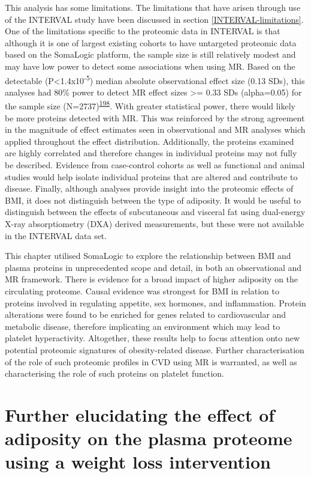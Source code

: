 \documentclass[11pt,twoside]{bristolthesis}
\begin{document}
This analysis has some limitations. The limitations that have arisen through use of the INTERVAL study have been discussed in section \ref{INTERVAL-limitations}. One of the limitations specific to the proteomic data in INTERVAL is that although it is one of largest existing cohorts to have untargeted proteomic data based on the SomaLogic platform, the sample size is still relatively modest and may have low power to detect some associations when using MR. Based on the detectable (P\textless1.4x10\textsuperscript{-5}) median absolute observational effect size (0.13 SDs), this analyses had 80\% power to detect MR effect sizes \textgreater= 0.33 SDs (alpha=0.05) for the sample size (N=2737)\textsuperscript{\protect\hyperlink{ref-Brion2013}{198}}. With greater statistical power, there would likely be more proteins detected with MR. This was reinforced by the strong agreement in the magnitude of effect estimates seen in observational and MR analyses which applied throughout the effect distribution. Additionally, the proteins examined are highly correlated and therefore changes in individual proteins may not fully be described. Evidence from case-control cohorts as well as functional and animal studies would help isolate individual proteins that are altered and contribute to disease. Finally, although analyses provide insight into the proteomic effects of BMI, it does not distinguish between the type of adiposity. It would be useful to distinguish between the effects of subcutaneous and visceral fat using dual-energy X-ray absorptiometry (DXA) derived measurements, but these were not available in the INTERVAL data set.

This chapter utilised SomaLogic to explore the relationship between BMI and plasma proteins in unprecedented scope and detail, in both an observational and MR framework. There is evidence for a broad impact of higher adiposity on the circulating proteome. Causal evidence was strongest for BMI in relation to proteins involved in regulating appetite, sex hormones, and inflammation. Protein alterations were found to be enriched for genes related to cardiovascular and metabolic disease, therefore implicating an environment which may lead to platelet hyperactivity. Altogether, these results help to focus attention onto new potential proteomic signatures of obesity-related disease. Further characterisation of the role of such proteomic profiles in CVD using MR is warranted, as well as characterising the role of such proteins on platelet function.

\hypertarget{BMI-protein-RCT}{%
\chapter{Further elucidating the effect of adiposity on the plasma proteome using a weight loss intervention}\label{BMI-protein-RCT}}
\end{document}
